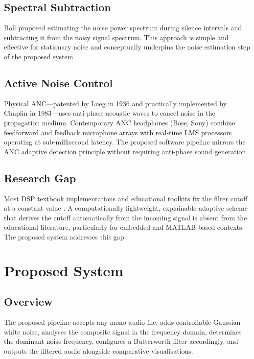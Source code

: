 \documentclass[conference]{IEEEtran}
\begin{document}
\subsection{Spectral Subtraction}
Boll \cite{boll1979} proposed estimating the noise power spectrum during
silence intervals and subtracting it from the noisy signal spectrum.
This approach is simple and effective for stationary noise and conceptually
underpins the noise estimation step of the proposed system.

\subsection{Active Noise Control}
Physical ANC---patented by Lueg in 1936 and practically implemented by
Chaplin in 1983---uses anti-phase acoustic waves to cancel noise in the
propagation medium. Contemporary ANC headphones (Bose, Sony) combine
feedforward and feedback microphone arrays with real-time LMS processors
operating at sub-millisecond latency. The proposed software pipeline mirrors
the ANC adaptive detection principle without requiring anti-phase sound
generation.

\subsection{Research Gap}
Most DSP textbook implementations and educational toolkits fix the filter
cutoff at a constant value \cite{proakis2006}. A computationally lightweight,
explainable adaptive scheme that derives the cutoff automatically from the
incoming signal is absent from the educational literature, particularly for
embedded and MATLAB-based contexts. The proposed system addresses this gap.

\section{Proposed System}

\subsection{Overview}
The proposed pipeline accepts any mono audio file, adds controllable Gaussian
white noise, analyses the composite signal in the frequency domain, determines
the dominant noise frequency, configures a Butterworth filter accordingly,
and outputs the filtered audio alongside comparative visualisations.
\end{document}
